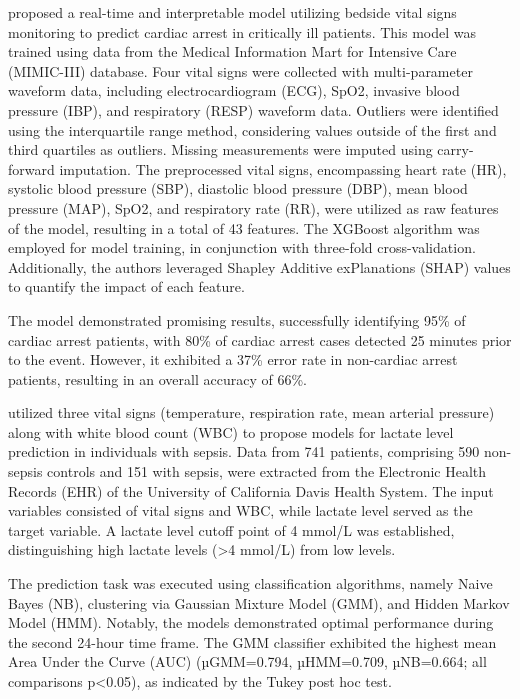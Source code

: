 \documentclass[12pt,a4paper,english
]{tunithesis}
\begin{document}
\textcite{yijing2022} proposed a real-time and interpretable model utilizing bedside vital signs monitoring to predict cardiac arrest in critically ill patients. This model was trained using data from the Medical Information Mart for Intensive Care (MIMIC-III) database. Four vital signs were collected with multi-parameter waveform data, including electrocardiogram (ECG), SpO2, invasive blood pressure (IBP), and respiratory (RESP) waveform data. Outliers were identified using the interquartile range method, considering values outside of the first and third quartiles as outliers. Missing measurements were imputed using carry-forward imputation. The preprocessed vital signs, encompassing heart rate (HR), systolic blood pressure (SBP), diastolic blood pressure (DBP), mean blood pressure (MAP), SpO2, and respiratory rate (RR), were utilized as raw features of the model, resulting in a total of 43 features. The XGBoost algorithm was employed for model training, in conjunction with three-fold cross-validation. Additionally, the authors leveraged Shapley Additive exPlanations (SHAP) values to quantify the impact of each feature. 

The model demonstrated promising results, successfully identifying 95\% of cardiac arrest patients, with 80\% of cardiac arrest cases detected 25 minutes prior to the event. However, it exhibited a 37\% error rate in non-cardiac arrest patients, resulting in an overall accuracy of 66\%. 

\textcite{gultepe2013} utilized three vital signs (temperature, respiration rate, mean arterial pressure) along with white blood count (WBC) to propose models for lactate level prediction in individuals with sepsis. Data from 741 patients, comprising 590 non-sepsis controls and 151 with sepsis, were extracted from the Electronic Health Records (EHR) of the University of California Davis Health System. The input variables consisted of vital signs and WBC, while lactate level served as the target variable. A lactate level cutoff point of 4 mmol/L was established, distinguishing high lactate levels (\textgreater4 mmol/L) from low levels.

The prediction task was executed using classification algorithms, namely Naive Bayes (NB), clustering via Gaussian Mixture Model (GMM), and Hidden Markov Model (HMM). Notably, the models demonstrated optimal performance during the second 24-hour time frame. The GMM classifier exhibited the highest mean Area Under the Curve (AUC) (µGMM=0.794, µHMM=0.709, µNB=0.664; all comparisons p\textless0.05), as indicated by the Tukey post hoc test.
\end{document}
